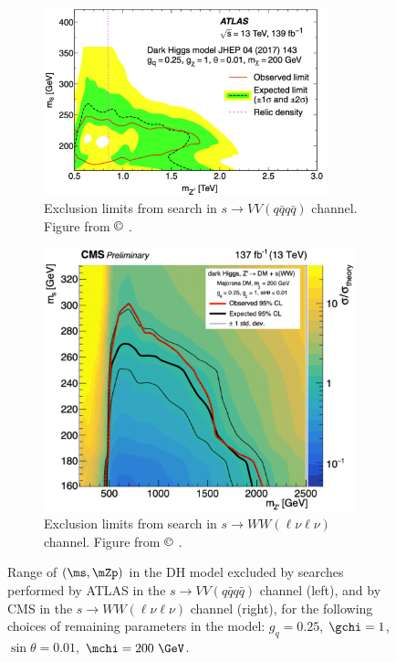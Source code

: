 \begin{figure}[hp]
	\centering
\begin{subfigure}[t]{0.53\textwidth}
	\centering
	\includegraphics[width=0.9\textwidth]{Figures/2/monos_had_limits.pdf}
\caption{Exclusion limits from search in \(s\rightarrow VV(q\bar{q}q\bar{q})\) channel. Figure from $\copyright$ \cite{monos_had_paper}.}
\label{fig:monosVV_had_limits}
\end{subfigure}
\begin{subfigure}[t]{0.45\textwidth}
	\centering
	\includegraphics[width=0.99\textwidth]{Figures/2/monos_lep_limits.pdf}
\caption{Exclusion limits from search in \(s\rightarrow WW(\ell\nu\ell\nu)\) channel. Figure from $\copyright$ \cite{cms_monos_lep}.}
\label{fig:monosWW_lep_limits}
\end{subfigure}
	\caption{Range of \((\ms, \mZp)\) in the DH model excluded by searches performed by ATLAS in the \(s\rightarrow VV(q\bar{q}q\bar{q})\) channel (left), and by CMS in the \(s\rightarrow WW(\ell\nu\ell\nu)\) channel (right), for the following choices of remaining parameters in the model: \(g_q=0.25\), \(\gchi=1\), \(\sin\theta=0.01\), \(\mchi=200~\GeV\).}
	\label{fig:mono_sVV_limits}
\end{figure}

